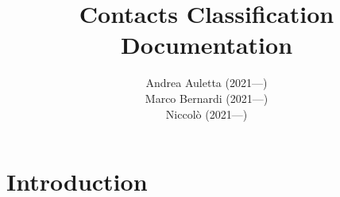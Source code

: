 \documentclass{article}
\title{Contacts Classification Documentation}
\author{Andrea Auletta (2021---)\\
        Marco Bernardi (2021---) \\
        Niccolò (2021---)}
\begin{document}
\maketitle
\section{Introduction}
\end{document}
